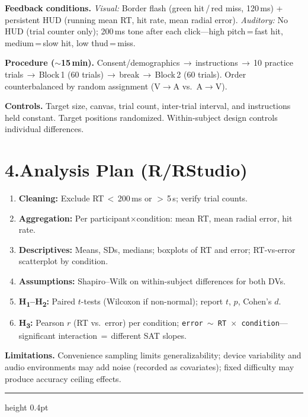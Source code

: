 \documentclass[12pt,letterpaper]{article}
\begin{document}
\textbf{Feedback conditions.}
\emph{Visual:} Border flash (green hit\,/\,red miss, 120\,ms) + persistent HUD (running mean RT, hit rate, mean radial error).
\emph{Auditory:} No HUD (trial counter only); 200\,ms tone after each click---high pitch\,=\,fast hit, medium\,=\,slow hit, low thud\,=\,miss.

\textbf{Procedure ($\boldsymbol{\sim}$15\,min).}
Consent/demographics\,$\to$\,instructions\,$\to$\,10 practice trials\,$\to$\,Block\,1 (60 trials)\,$\to$\,break\,$\to$\,Block\,2 (60 trials). Order counterbalanced by random assignment (V$\to$A vs.\ A$\to$V).

\textbf{Controls.} Target size, canvas, trial count, inter-trial interval, and instructions held constant. Target positions randomized. Within-subject design controls individual differences.

\section*{4.\enspace Analysis Plan (R/RStudio)}
\begin{enumerate}
  \item \textbf{Cleaning:} Exclude RT\,$<$\,200\,ms or $>$\,5\,s; verify trial counts.
  \item \textbf{Aggregation:} Per participant$\times$condition: mean RT, mean radial error, hit rate.
  \item \textbf{Descriptives:} Means, SDs, medians; boxplots of RT and error; RT-vs-error scatterplot by condition.
  \item \textbf{Assumptions:} Shapiro--Wilk on within-subject differences for both DVs.
  \item \textbf{H\textsubscript{1}--H\textsubscript{2}:} Paired $t$-tests (Wilcoxon if non-normal); report $t$, $p$, Cohen's $d$.
  \item \textbf{H\textsubscript{3}:} Pearson $r$ (RT vs.\ error) per condition; \texttt{error\,$\sim$\,RT\,$\times$\,condition}---significant interaction\,$=$\,different SAT slopes.
\end{enumerate}

\textbf{Limitations.} Convenience sampling limits generalizability; device variability and audio environments may add noise (recorded as covariates); fixed difficulty may produce accuracy ceiling effects.

\vspace{0.25em}
{\color{accent}\hrule height 0.4pt}
\vspace{0.08em}
\end{document}
